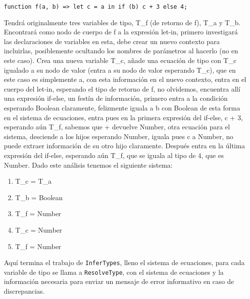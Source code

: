 \documentclass{article}
\begin{document}
\texttt{function f(a, b) => let c = a in if (b) c + 3 else 4;}

Tendrá originalmente tres variables de tipo, T\_f (de retorno de f), T\_a y T\_b. Encontrará como nodo de cuerpo de f a la expresión let-in, primero investigará las declaraciones de variables en esta, debe crear un nuevo contexto para incluirlas, posiblemente ocultando los nombres de parámetros al hacerlo (no en este caso). Crea una nueva variable T\_c, añade una ecuación de tipo con T\_c igualado a su nodo de valor (entra a su nodo de valor esperando T\_c), que en este caso es simplemente a, con esta información en el nuevo contexto, entra en el cuerpo del let-in, esperando el tipo de retorno de f, no olvidemos, encuentra allí una expresión if-else, un festín de información, primero entra a la condición esperando Boolean claramente, felizmente iguala a b con Boolean de esta forma en el sistema de ecuaciones, entra pues en la primera expresión del if-else, c + 3, esperando aún T\_f, sabemos que + devuelve Number, otra ecuación para el sistema, desciende a los hijos esperando Number, iguala pues c a Number, no puede extraer información de su otro hijo claramente. Después entra en la última expresión del if-else, esperando aún T\_f, que se iguala al tipo de 4, que es Number. Dado este análisis tenemos el siguiente sistema:

\begin{enumerate}
    \item  T\_c = T\_a
    \item T\_b = Boolean
    \item T\_f = Number
    \item T\_c = Number
    \item T\_f = Number
\end{enumerate}

Aquí termina el trabajo de \texttt{InferTypes}, lleno el sistema de ecuaciones, para cada variable de tipo se llama a \texttt{ResolveType}, con el sistema de ecuaciones y la información necesaria para enviar un mensaje de error informativo en caso de discrepancias.
\end{document}

